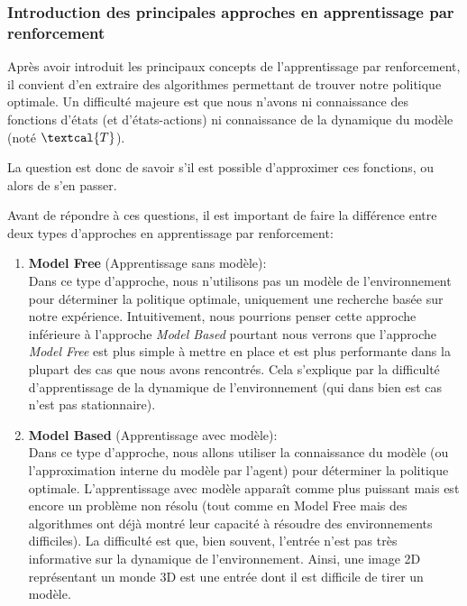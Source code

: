 \subsubsection{Introduction des principales approches en apprentissage par renforcement}

Après avoir introduit les principaux concepts de l'apprentissage par renforcement, il convient d'en extraire des algorithmes permettant de trouver notre politique optimale. Un difficulté majeure est que nous n'avons ni connaissance des fonctions d'états (et d'états-actions) ni connaissance de la dynamique du modèle (noté $\textcal{T}$).

La question est donc de savoir s'il est possible d'approximer ces fonctions, ou alors de s'en passer.

Avant de répondre à ces questions, il est important de faire la différence entre deux types d'approches en apprentissage par renforcement: 

\begin{enumerate}
    \item \textbf{Model Free} (Apprentissage sans modèle): \\
        Dans ce type d'approche, nous n'utilisons pas un modèle de l'environnement pour déterminer la politique optimale, uniquement une recherche basée sur notre expérience. Intuitivement, nous pourrions penser cette approche inférieure à l'approche \emph{Model Based} pourtant nous verrons que l'approche \emph{Model Free} est plus simple à mettre en place et est plus performante dans la plupart des cas que nous avons rencontrés. Cela s'explique par la difficulté d'apprentissage de la dynamique de l'environnement (qui dans bien est cas n'est pas stationnaire).
    
    \item \textbf{Model Based} (Apprentissage avec modèle): \\
        Dans ce type d'approche, nous allons utiliser la connaissance du modèle (ou l'approximation interne du modèle par l'agent) pour déterminer la politique optimale. L'apprentissage avec modèle apparaît comme plus puissant mais est encore un problème non résolu (tout comme en Model Free mais des algorithmes ont déjà montré leur capacité à résoudre des environnements difficiles). La difficulté est que, bien souvent, l'entrée n'est pas très informative sur la dynamique de l'environnement. Ainsi, une image 2D représentant un monde 3D est une entrée dont il est difficile de tirer un modèle. 
\end{enumerate}

